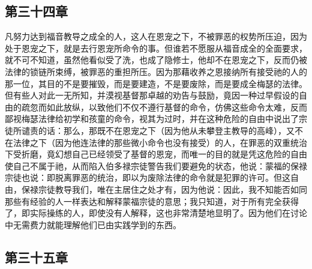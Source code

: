 
\subsection{第三十四章}

\par

凡努力达到福音教导之成全的人，这人在恩宠之下，不被罪恶的权势所压迫，因为处于恩宠之下，就是去行恩宠所命令的事。但谁若不愿服从福音成全的全面要求，就不可不知道，虽然他看似受了洗，也成了隐修士，他却不在恩宠之下，反而仍被法律的锁链所束缚，被罪恶的重担所压。因为那藉收养之恩接纳所有接受祂的人的那一位，其目的不是要摧毁，而是要建造，不是要废除，而是要成全梅瑟的法律。但有些人对此一无所知，并漠视基督那卓越的劝告与鼓励，竟因一种过早假设的自由的疏忽而如此放纵，以致他们不仅不遵行基督的命令，仿佛这些命令太难，反而鄙视梅瑟法律给初学和孩童的命令，视其为过时，并在这种危险的自由中说出了宗徒所谴责的话：那么，那既不在恩宠之下（因为他从未攀登主教导的高峰），又不在法律之下（因为他连法律的那些微小命令也没有接受）的人，在罪恶的双重统治下受折磨，竟幻想自己已经领受了基督的恩宠，而唯一的目的就是凭这危险的自由使自己不属于祂，从而陷入伯多禄宗徒警告我们要避免的状态，他说：蒙福的保禄宗徒也说：即脱离罪恶的统治，即以为废除法律的命令就是犯罪的许可。但这自由，保禄宗徒教导我们，唯在主居住之处才有，因为他说：因此，我不知能否如同那些有经验的人一样表达和解释蒙福宗徒的意思；我只知道，对于所有完全获得了，即实际操练的人，即使没有人解释，这也非常清楚地显明了。因为他们在讨论中无需费力就能理解他们已由实践学到的东西。\par


\subsection{第三十五章}

\par

